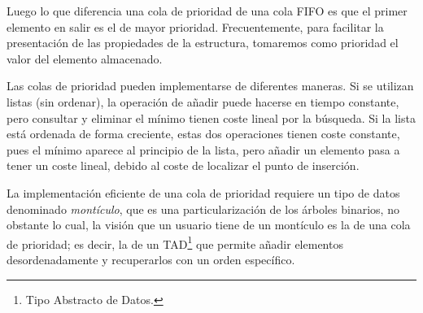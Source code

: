 Luego lo que diferencia una cola de prioridad de una cola FIFO es que el primer elemento en salir es el de mayor prioridad. Frecuentemente, para facilitar la presentación de las propiedades de la estructura, tomaremos como prioridad el valor del elemento almacenado.\newline

Las colas de prioridad pueden implementarse de diferentes maneras. Si se utilizan listas (sin ordenar), la operación de añadir puede hacerse en tiempo constante, pero consultar y eliminar el mínimo tienen coste lineal por la búsqueda. Si la lista está ordenada de forma creciente, estas dos operaciones tienen coste constante, pues el mínimo aparece al principio de la lista, pero añadir un elemento pasa a tener un coste lineal, debido al coste de localizar el punto de inserción.\newline

La implementación eficiente de una cola de prioridad requiere un tipo de datos denominado \textit{montículo}, que es una particularización de los árboles binarios, no obstante lo cual, la visión que un usuario tiene de un montículo es la de una cola de prioridad; es decir, la de un TAD\footnote{Tipo Abstracto de Datos.} que permite añadir elementos desordenadamente y recuperarlos con un orden específico.